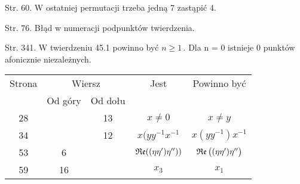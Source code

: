 \documentclass[a4paper,11pt]{article}
\numberwithin{equation}{section}
\begin{document}
\VerSpaceFour





\noindent
Str. 60. W ostatniej permutacji trzeba jedną 7 zastąpić 4.

\VerSpaceFour





\noindent
Str. 76. Błąd w numeracji podpunktów twierdzenia.

\VerSpaceFour





\noindent
Str. 341. W twierdzeniu 45.1 powinno być $n \geq 1 \, .$ Dla n = 0
istnieje 0 punktów afonicznie niezależnych.





\newpage



\begin{center}

  \begin{tabular}{|c|c|c|c|c|}
    \hline
    Strona & \multicolumn{2}{c|}{Wiersz} & Jest
                              & Powinno być \\ \cline{2-3}
    & Od góry & Od dołu & & \\
    \hline
    28  & & 13 & $x \neq 0$ & $x \neq y$ \\
    34  & & 12 & $x ( y y^{ -1 } x^{ -1 }$ & $x ( y y^{ -1 } ) x^{ -1 }$ \\
    53  &  6 & & $\operatorname{\mathfrak{Re}}( ( \eta \eta' ) \eta'' ) )$
           & $\operatorname{\mathfrak{Re}}\big( ( \eta \eta' ) \eta'' \big)$ \\
    59  & 16 & & $x_{ 3 }$ & $x_{ 1 }$ \\
    \hline
  \end{tabular}

\end{center}
\end{document}
